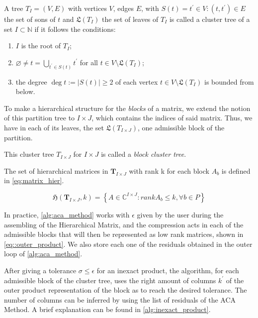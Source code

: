A tree $T_{I} = (V,E)$ with vertices $V$, edges $E$, with $S(t)={t^{'} \in V : (t,t^{'})\in E}$ the set of sons of $t$ and $\mathfrak{L}(T_{I})$ the set of leaves of $T_{I}$ is called a cluster tree of a set $I\subset \mathbb{N}$ if it follows the conditions:

\begin{enumerate}
    \item $I$ is the root of $T_{I}$;
    \item $\varnothing \neq t = \bigcup_{t^{'} \in S(t)} t^{'} $ for all $t \in V \setminus   \mathfrak{L}(T_{I}) $;
    \item the degree $\deg t := |S(t)| \geq 2$ of each vertex $t \in V \setminus \mathfrak{L}(T_{I})$ is bounded from below.
\end{enumerate}



To make a hierarchical structure for the \textit{blocks} of a matrix, we extend the notion of this partition tree to $I \times J$, which contains the indices of said matrix. Thus, we have in each of its leaves, the set $\mathfrak{L}(T_{I \times J})$, one admissible block of the partition.

This cluster tree $T_{I \times J}$ for $I \times J$ is called a \textit{block cluster tree}.


The set of hierarchical matrices in $\mathbf{T}_{I \times J}$ with rank k for each block $A_{b}$ is defined in \ref{eq:matrix_hier}.

\begin{equation}\label{eq:matrix_hier}
    \mathfrak{H}(\mathbf{T}_{I \times J},k) = \left\{  A\in \mathbb{C}^{I\times J} : rankA_{b} \leq k, \forall b \in P \right\}
\end{equation}



In practice, \ref{alg:aca_method} works with $\epsilon$ given by the user during the assembling of the Hierarchical Matrix, and the compression acts in each of the admissible blocks that will then be represented as low rank matrices, shown in \ref{eq::outer_product}. We also store each one of the residuals obtained in the outer loop of \ref{alg:aca_method}.

After giving a tolerance $\sigma \leq \epsilon$ for an inexact product, the algorithm, for each admissible block of the cluster tree, uses the right amount of columns $k^{'}$ of the outer product representation of the block as to reach the desired tolerance. The number of columns can be inferred by using the list of residuals of the ACA Method. A brief explanation can be found in \ref{alg:inexact_product}.

